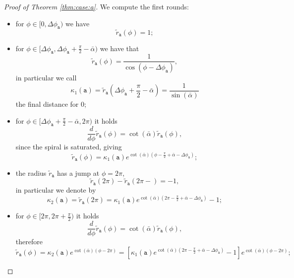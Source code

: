 \documentclass[reqno]{amsart}
\theoremstyle{definition} \newtheorem{definition}{Definition}[section]
\theoremstyle{definition} \newtheorem{remark}[definition]{Remark}
\theoremstyle{plain} \newtheorem{lemma}[definition]{Lemma}
\theoremstyle{plain} \newtheorem{proposition}[definition]{Proposition}
\theoremstyle{plain} \newtheorem{theorem}[definition]{Theorem}
\theoremstyle{plain} \newtheorem{corollary}[definition]{Corollary}
\theoremstyle{definition} \newtheorem{example}[definition]{Example}
\theoremstyle{plain} \newtheorem{claim}[clai]{Claim}
\theoremstyle{definition} \newtheorem{assumption}[definition]{Assumption}
\theoremstyle{definition} \newtheorem{observation}[definition]{Observation}
\newcommand{\1}{\mathbbm 1}
\numberwithin{equation}{section} %
\theoremstyle{plain} \newtheorem*{theorem*}{Theorem}
\theoremstyle{plain} \newtheorem{mthm}[maintheorem]{Main Theorem}
\theoremstyle{plain} \newtheorem*{mthm*}{Main Theorem}
\theoremstyle{plain} \newtheorem*{conjecture*}{Conjecture}
\theoremstyle{plain} \newtheorem{conjecture}[definition]{Conjecture}
\theoremstyle{plain} \newtheorem*{problem*}{Problem}
\begin{document}
\begin{proof}[Proof of Theorem \ref{thm:case:a}]
 We compute the first rounds:
\begin{itemize}
\item for $\phi \in [0,\Delta \phi_{\mathtt a})$ we have
\begin{equation*}
\tilde r_{\mathtt a}(\phi) = 1;
\end{equation*}
\item for $\phi \in [\Delta \phi_{\mathtt a}, \Delta \phi_{\mathtt a} + \frac{\pi}{2} -\bar \alpha)$ we have that
\begin{equation*}
\tilde r_{\mathtt a}(\phi) = \frac{1}{\cos(\phi - \Delta\phi_{\mathtt a})},
\end{equation*}
in particular we call
\begin{equation*}
\kappa_1(\mathtt a) = \tilde r_{\mathtt a} \left( \Delta \phi_{\mathtt a} + \frac{\pi}{2} -\bar \alpha \right) = \frac{1}{\sin(\bar\alpha)}
\end{equation*}
the final distance for $0$;
\item for $\phi \in [\Delta \phi_{\mathtt a} + \frac{\pi}{2} - \bar \alpha, 2\pi)$ it holds
\begin{equation*}
\frac{d}{d\phi} \tilde r_{\mathtt a}(\phi) = \cot(\bar\alpha) \tilde r_{\mathtt a}(\phi),
\end{equation*}
since the spiral is saturated, giving
\begin{equation*}
\tilde r_{\mathtt a}(\phi) = \kappa_1(\mathtt a) e^{\cot(\bar\alpha)(\phi - \frac{\pi}{2} + \bar\alpha - \Delta \phi_{\mathtt a})};
\end{equation*}
\item the radius $\tilde r_{\mathtt a}$ has a jump at $\phi = 2\pi$,
\begin{equation*}
\tilde r_{\mathtt a}(2\pi)-\tilde r_{\mathtt a}(2\pi-)=-1,
\end{equation*}
in particular we denote by
\begin{equation*}
\kappa_2(\mathtt a) = \tilde r_{\mathtt a}(2\pi) = \kappa_1(\mathtt a) e^{\cot(\bar \alpha) (2\pi - \frac{\pi}{2} + \bar \alpha-\Delta \phi_{\mathtt a})}-1;
\end{equation*}
\item for $\phi \in [2\pi,2\pi+\frac{\pi}{2})$ it holds
\begin{equation*}
\frac{d}{d\phi} \tilde r_{\mathtt a}(\phi) = \cot(\bar\alpha) \tilde r_{\mathtt a}(\phi),
\end{equation*}
therefore
\begin{equation*}
\tilde r_{\mathtt a}(\phi) = \kappa_2(\mathtt a) e^{\cot(\bar\alpha)(\phi - 2\pi)} = \left[ \kappa_1(\mathtt a) e^{\cot(\bar \alpha) (2\pi - \frac{\pi}{2} + \bar \alpha - \Delta \phi_{\mathtt a})} - 1 \right] e^{\cot(\bar\alpha)(\phi - 2\pi)};

\end{equation*}
\end{itemize}
\end{proof}
\end{document}
